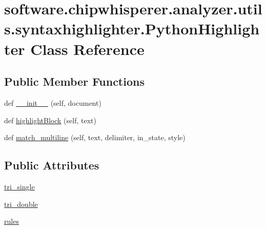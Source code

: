 \hypertarget{classsoftware_1_1chipwhisperer_1_1analyzer_1_1utils_1_1syntaxhighlighter_1_1PythonHighlighter}{}\section{software.\+chipwhisperer.\+analyzer.\+utils.\+syntaxhighlighter.\+Python\+Highlighter Class Reference}
\label{classsoftware_1_1chipwhisperer_1_1analyzer_1_1utils_1_1syntaxhighlighter_1_1PythonHighlighter}
\subsection*{Public Member Functions}
\begin{DoxyCompactItemize}
\item 
def \hyperlink{classsoftware_1_1chipwhisperer_1_1analyzer_1_1utils_1_1syntaxhighlighter_1_1PythonHighlighter_a8c04cc586167fb82a4b0b036b7cb0f14}{\+\_\+\+\_\+init\+\_\+\+\_\+} (self, document)
\item 
def \hyperlink{classsoftware_1_1chipwhisperer_1_1analyzer_1_1utils_1_1syntaxhighlighter_1_1PythonHighlighter_a489b83d01ae6e38ad73e3e86a6fd43bb}{highlight\+Block} (self, text)
\item 
def \hyperlink{classsoftware_1_1chipwhisperer_1_1analyzer_1_1utils_1_1syntaxhighlighter_1_1PythonHighlighter_a547033e018e06d765eea4974f7f7647c}{match\+\_\+multiline} (self, text, delimiter, in\+\_\+state, style)
\end{DoxyCompactItemize}
\subsection*{Public Attributes}
\begin{DoxyCompactItemize}
\item 
\hyperlink{classsoftware_1_1chipwhisperer_1_1analyzer_1_1utils_1_1syntaxhighlighter_1_1PythonHighlighter_a20db7befbb80fc505e9f641ee97ea9ef}{tri\+\_\+single}
\item 
\hyperlink{classsoftware_1_1chipwhisperer_1_1analyzer_1_1utils_1_1syntaxhighlighter_1_1PythonHighlighter_a28f1aa6d52aab1f3ba742b8f93a9ac39}{tri\+\_\+double}
\item 
\hyperlink{classsoftware_1_1chipwhisperer_1_1analyzer_1_1utils_1_1syntaxhighlighter_1_1PythonHighlighter_a144a306a7cf18c752a6fbe3d88d2bc9e}{rules}
\end{DoxyCompactItemize}
